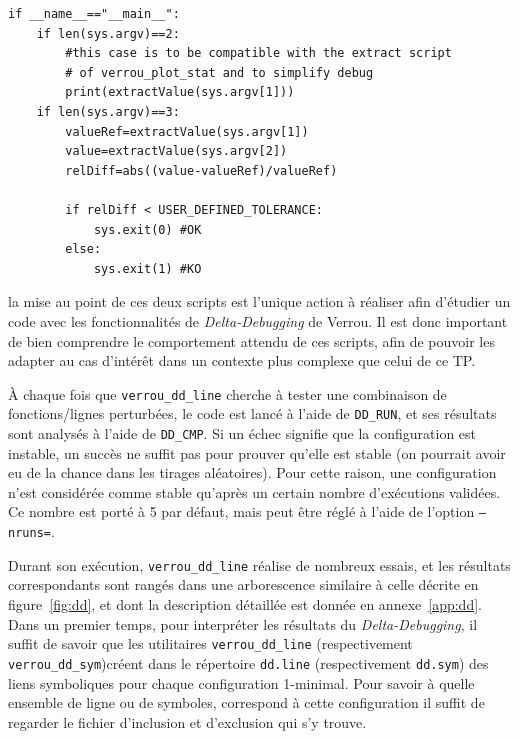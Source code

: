 \documentclass[a4paper]{article}
\def\mdfilename{File}
\newenvironment{file}[1][Fichier]{
  \def\mdfilename{#1}
  \begin{mdframed}[style=file]
}{
  \end{mdframed}
}
\newenvironment{info}[1][NB :]{
  \begin{mdframed}[style=info]
    \noindent{\bf #1}
}{
  \end{mdframed}
}
\begin{document}
\begin{itemize}
\begin{file}[ddCmp.py]
\begin{verbatim}
if __name__=="__main__":
    if len(sys.argv)==2:
        #this case is to be compatible with the extract script
        # of verrou_plot_stat and to simplify debug
        print(extractValue(sys.argv[1]))
    if len(sys.argv)==3:
        valueRef=extractValue(sys.argv[1])
        value=extractValue(sys.argv[2])
        relDiff=abs((value-valueRef)/valueRef)

        if relDiff < USER_DEFINED_TOLERANCE:
            sys.exit(0) #OK
        else:
            sys.exit(1) #KO
\end{verbatim}
\end{file}

\end{itemize}

\begin{info}
  la mise au point de ces deux scripts est l'unique action à réaliser afin
  d'étudier un code avec les fonctionnalités de \textit{Delta-Debugging} de
  Verrou. Il est donc important de bien comprendre le comportement attendu de
  ces scripts, afin de pouvoir les adapter au cas d'intérêt dans un contexte
  plus complexe que celui de ce TP.
\end{info}

\bigskip

À chaque fois que \texttt{verrou\_dd\_line} cherche à tester une combinaison de
fonctions/lignes perturbées, le code est lancé à l'aide de \texttt{DD\_RUN}, et
ses résultats sont analysés à l'aide de \texttt{DD\_CMP}. Si un échec signifie
que la configuration est instable, un succès ne suffit pas pour prouver qu'elle
est stable (on pourrait avoir eu de la chance dans les tirages aléatoires). Pour
cette raison, une configuration n'est considérée comme stable qu'après un
certain nombre d'exécutions validées. Ce nombre est porté à 5 par défaut, mais
peut être réglé à l'aide de l'option \texttt{--nruns=}.

\bigskip

Durant son exécution, \texttt{verrou\_dd\_line} réalise de nombreux essais, et les
résultats correspondants sont rangés dans une arborescence similaire à celle
décrite en figure~\ref{fig:dd}, et dont la description détaillée est donnée en
annexe~\ref{app:dd}. Dans un premier temps, pour interpréter les résultats du
\textit{Delta-Debugging}, il suffit de savoir que les utilitaires
\texttt{verrou\_dd\_line} (respectivement \texttt{verrou\_dd\_sym})créent dans
le répertoire \texttt{dd.line} (respectivement \texttt{dd.sym}) des liens symboliques pour
chaque configuration 1-minimal. Pour savoir à quelle ensemble de ligne ou de
symboles, correspond à cette configuration il suffit de regarder le fichier d'inclusion et
d'exclusion qui s'y trouve.
\end{document}
